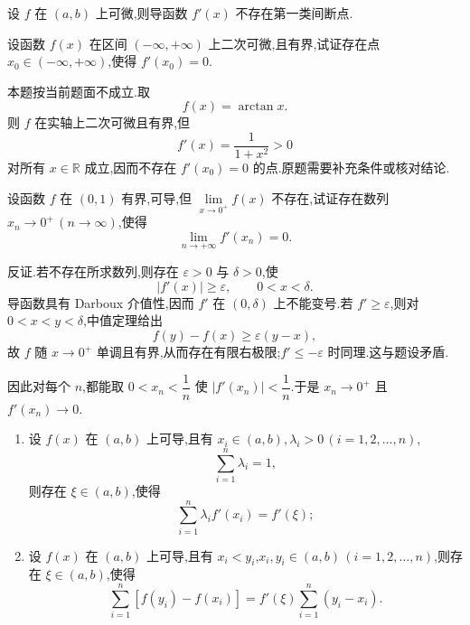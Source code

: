 \begin{corollary}[\markstar]
    设 $f$ 在 $(a,b)$ 上可微,则导函数 $f'(x)$ 不存在第一类间断点.
\end{corollary}

\begin{example}
    设函数 $f(x)$ 在区间 $(-\infty,+\infty)$ 上二次可微,且有界,试证存在点 $x_0\in(-\infty,+\infty)$,使得 $f'(x_0)=0$.
\end{example}
\exampleblank

\begin{solution}
    本题按当前题面不成立.取
    \[
        f(x)=\arctan x.
    \]
    则 $f$ 在实轴上二次可微且有界,但
    \[
        f'(x)=\dfrac{1}{1+x^2}>0
    \]
    对所有 $x\in\mathbb{R}$ 成立,因而不存在 $f'(x_0)=0$ 的点.原题需要补充条件或核对结论.
\end{solution}

\begin{example}
    设函数 $f$ 在 $(0,1)$ 有界,可导,但 $\displaystyle\lim\limits_{x\to0^+}f(x)$ 不存在,试证存在数列 $x_n\to0^+\,(n\to\infty)$,使得
    \[
        \displaystyle\lim\limits_{n\to+\infty}f'(x_n)=0.
    \]
\end{example}
\exampleblank

\begin{solution}
    反证.若不存在所求数列,则存在 $\varepsilon>0$ 与 $\delta>0$,使
    \[
        |f'(x)|\geq\varepsilon,
        \qquad 0<x<\delta.
    \]
    导函数具有 Darboux 介值性,因而 $f'$ 在 $(0,\delta)$ 上不能变号.若 $f'\geq\varepsilon$,则对 $0<x<y<\delta$,中值定理给出
    \[
        f(y)-f(x)\geq\varepsilon(y-x),
    \]
    故 $f$ 随 $x\to0^+$ 单调且有界,从而存在有限右极限;$f'\leq-\varepsilon$ 时同理.这与题设矛盾.

    因此对每个 $n$,都能取 $0<x_n<\dfrac{1}{n}$ 使 $|f'(x_n)|<\dfrac{1}{n}$.于是 $x_n\to0^+$ 且 $f'(x_n)\to0$.
\end{solution}

\begin{example}
    \begin{enumerate}
        \item 设 $f(x)$ 在 $(a,b)$ 上可导,且有 $x_i\in(a,b),\lambda_i>0\,(i=1,2,\ldots,n)$,
              \[
                  \displaystyle\sum\limits_{i=1}^n\lambda_i=1,
              \]
              则存在 $\xi\in(a,b)$,使得
              \[
                  \displaystyle\sum\limits_{i=1}^n\lambda_i f'(x_i)=f'(\xi);
              \]
        \item 设 $f(x)$ 在 $(a,b)$ 上可导,且有 $x_i<y_i$,$x_i,y_i\in(a,b)\,(i=1,2,\ldots,n)$,则存在 $\xi\in(a,b)$,使得
              \[
                  \displaystyle\sum\limits_{i=1}^n[f(y_i)-f(x_i)]
                  =f'(\xi)\sum\limits_{i=1}^n(y_i-x_i).
              \]
    \end{enumerate}
\end{example}
\exampleblank

